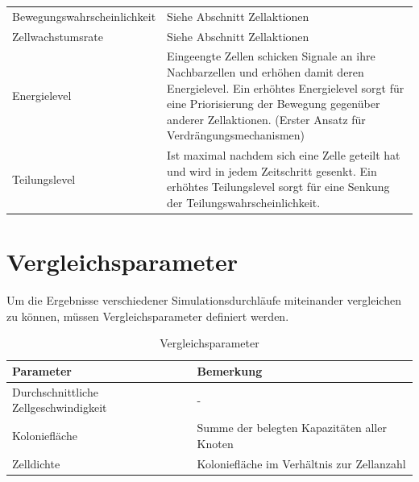 \documentclass[11pt,a4paper,pointlessnumbers]{scrreprt}  %
\begin{document}
\begin{table}[!ht]
\begin{tabularx}{\textwidth}{lX}
		Bewegungswahrscheinlichkeit    & Siehe Abschnitt Zellaktionen                                                                                                                                                                                                                   \\
		Zellwachstumsrate              & Siehe Abschnitt Zellaktionen                                                                                                                                                                                                                   \\
		Energielevel                   & Eingeengte Zellen schicken Signale an ihre Nachbarzellen und erhöhen damit deren Energielevel. Ein erhöhtes Energielevel sorgt für eine Priorisierung der Bewegung gegenüber anderer Zellaktionen. (Erster Ansatz für Verdrängungsmechanismen) \\
		Teilungslevel                  & Ist maximal nachdem sich eine Zelle geteilt hat und wird in jedem Zeitschritt gesenkt. Ein erhöhtes Teilungslevel sorgt für eine Senkung der Teilungswahrscheinlichkeit.                                                                       \\ \bottomrule
	\end{tabularx}
\end{table}

\section{Vergleichsparameter}
Um die Ergebnisse verschiedener Simulationsdurchläufe miteinander vergleichen zu können, müssen Vergleichsparameter definiert werden. 

\begin{table}[!ht]
	\centering
	\caption{Vergleichsparameter}
	\label{my-label}
	\begin{tabularx}{\textwidth}{lX}
		\toprule
		Parameter                             & Bemerkung                                  \\ \midrule
		Durchschnittliche Zellgeschwindigkeit & -                                          \\
		Koloniefläche                         & Summe der belegten Kapazitäten aller Knoten \\
		Zelldichte                            & Koloniefläche im Verhältnis zur Zellanzahl \\ \bottomrule
	\end{tabularx}
\end{table}
\end{document}
